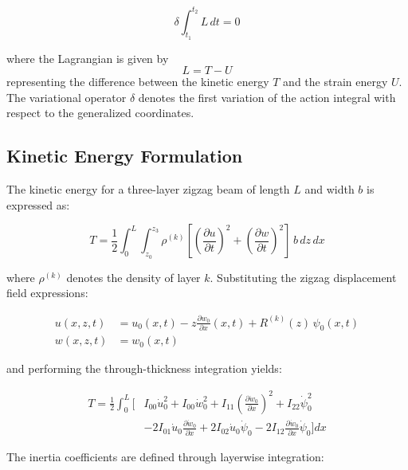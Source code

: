 \documentclass[12pt,a4paper]{report}
\begin{document}
\begin{equation}
\delta \int_{t_1}^{t_2} L \, dt = 0
\end{equation}

where the Lagrangian is given by
\begin{equation}
L = T - U
\end{equation}
representing the difference between the kinetic energy $T$ and the strain energy $U$. The variational operator $\delta$ denotes the first variation of the action integral with respect to the generalized coordinates.

\subsection*{Kinetic Energy Formulation}

The kinetic energy for a three-layer zigzag beam of length $L$ and width $b$ is expressed as:

\begin{equation}
T = \frac{1}{2} \int_0^L \int_{z_0}^{z_3} \rho^{(k)} 
\left[ \left(\frac{\partial u}{\partial t}\right)^2 
     + \left(\frac{\partial w}{\partial t}\right)^2 \right] 
\, b \, dz \, dx
\end{equation}

where $\rho^{(k)}$ denotes the density of layer $k$.  
Substituting the zigzag displacement field expressions:

\begin{align}
u(x,z,t) &= u_0(x,t) - z \frac{\partial w_0}{\partial x}(x,t) 
           + R^{(k)}(z) \, \psi_0(x,t) \\[6pt]
w(x,z,t) &= w_0(x,t)
\end{align}

and performing the through-thickness integration yields:

\begin{align}
T = \frac{1}{2} \int_0^L \Big[ & I_{00}\dot{u}_0^2 + I_{00}\dot{w}_0^2 
+ I_{11}\left(\frac{\partial \dot{w}_0}{\partial x}\right)^2 + I_{22}\dot{\psi}_0^2 \nonumber \\
& - 2I_{01}\dot{u}_0\frac{\partial \dot{w}_0}{\partial x} 
+ 2I_{02}\dot{u}_0\dot{\psi}_0 
- 2I_{12}\frac{\partial \dot{w}_0}{\partial x}\dot{\psi}_0 \Big] dx
\end{align}


The inertia coefficients are defined through layerwise integration:
\end{document}
